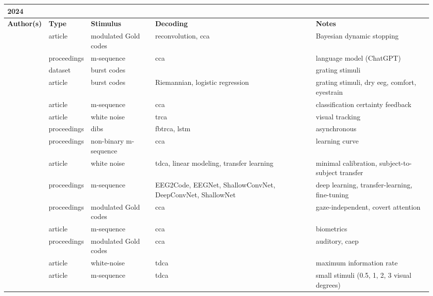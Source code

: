 \documentclass[a4paper,landscape]{article}
\begin{document}
\begin{table}[H]
	\begin{tabular}{p{5cm}p{2cm}p{5cm}p{5cm}p{6.5cm}}
		\textbf{2024} & & & & \\ 
		\toprule
		\textbf{Author(s)} & \textbf{Type} & \textbf{Stimulus} & \textbf{Decoding} & \textbf{Notes} \\ 
		\midrule
		\citeauthor{ahmadi2024} & article & modulated Gold codes & reconvolution, \acrshort{cca} & Bayesian dynamic stopping \\
		\citeauthor{canturk2024} & proceedings & m-sequence & \acrshort{cca} & language model (ChatGPT) \\
		\citeauthor{castillos2024dataset} & dataset & burst codes & & grating stimuli \\
		\citeauthor{dehais2024} & article & burst codes & Riemannian, logistic regression & grating stimuli, dry \acrshort{eeg}, comfort, eyestrain \\
		\citeauthor{fodor2024} & article & m-sequence & \acrshort{cca} & classification certainty feedback \\
		\citeauthor{huang2024} & article & white noise & \acrshort{trca} & visual tracking \\
		\citeauthor{lai2024} & proceedings & \acrshort{dibs} & \acrfull{fbtrca}, \acrshort{lstm} & asynchronous \\
		\citeauthor{martinezcagigal2024} & proceedings & non-binary m-sequence & \acrshort{cca} & learning curve \\
		\citeauthor{miao2024a} & article & white noise & \acrshort{tdca}, linear modeling, transfer learning & minimal calibration, subject-to-subject transfer \\
		\citeauthor{miao2024b} & proceedings & m-sequence & EEG2Code, EEGNet, ShallowConvNet, DeepConvNet, ShallowNet & deep learning, transfer-learning, fine-tuning \\
		\citeauthor{narayanan2024} & proceedings & modulated Gold codes & \acrshort{cca} & gaze-independent, covert attention \\
		\citeauthor{qu2024} & article & m-sequence & \acrshort{cca} & biometrics \\
		\citeauthor{scheppink2024} & proceedings & modulated Gold codes & \acrshort{cca} & auditory, \acrshort{caep} \\
		\citeauthor{shi2024} & article & white-noise & \acrshort{tdca} & maximum information rate \\
		\citeauthor{sun2024} & article & m-sequence & \acrshort{tdca} & small stimuli (0.5, 1, 2, 3 visual degrees) \\

\end{tabular}
\end{table}
\end{document}
